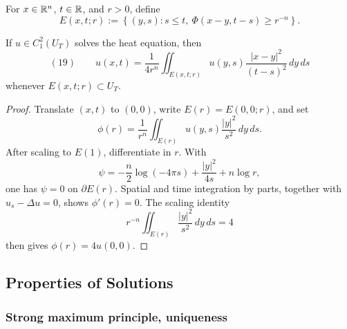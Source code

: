 \begin{definition}
\label{def:heat-ball}





For $x\in\mathbb{R}^n$, $t\in\mathbb{R}$, and $r>0$, define
$$E(x,t;r):=
\left\{(y,s):s\le t,\ \Phi(x-y,t-s)\ge r^{-n}\right\}.$$
\end{definition}

\begin{theorem}
\label{thm:mean-value-property-heat-equation}

If $u\in C_1^2(U_T)$ solves the heat equation, then
$$(19)\qquad
u(x,t)=\frac1{4r^n}\iint_{E(x,t;r)}
u(y,s)\frac{|x-y|^2}{(t-s)^2}\,dy\,ds$$
whenever $E(x,t;r)\subset U_T$.
\end{theorem}
\begin{proof}
\sketch Translate $(x,t)$ to $(0,0)$, write $E(r)=E(0,0;r)$, and set
$$\phi(r)=\frac1{r^n}\iint_{E(r)}u(y,s)\frac{|y|^2}{s^2}\,dy\,ds.$$
After scaling to $E(1)$, differentiate in $r$. With
$$\psi=-\frac n2\log(-4\pi s)+\frac{|y|^2}{4s}+n\log r,$$
one has $\psi=0$ on $\partial E(r)$. Spatial and time integration by parts,
together with $u_s-\Delta u=0$, shows $\phi'(r)=0$. The scaling identity
$$r^{-n}\iint_{E(r)}\frac{|y|^2}{s^2}\,dy\,ds=4$$
then gives $\phi(r)=4u(0,0)$.
\end{proof}

\subsection{Properties of Solutions}
\label{sec:heat-properties-of-solutions}

\subsubsection{Strong maximum principle, uniqueness}
\label{sec:heat-strong-maximum-principle}

